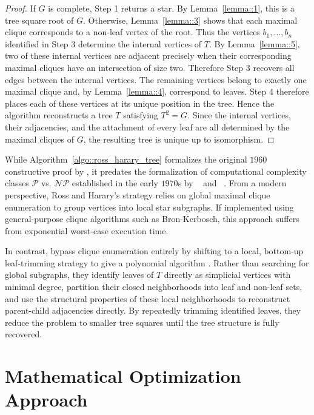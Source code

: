 \documentclass[11pt]{report}
\begin{document}
\begin{proof}
  If $G$ is complete, Step 1 returns a star. By Lemma~\ref{lemma::1}, this is a tree square root of $G$. Otherwise, Lemma~\ref{lemma::3} shows that each maximal clique corresponds to a non-leaf vertex of the root. Thus the vertices $b_1,\ldots,b_n$ identified in Step 3 determine the internal vertices of $T$. By Lemma~\ref{lemma::5}, two of these internal vertices are adjacent precisely when their corresponding maximal cliques have an intersection of size two. Therefore Step 3 recovers all edges between the internal vertices. The remaining vertices belong to exactly one maximal clique and, by Lemma~\ref{lemma::4}, correspond to leaves. Step 4 therefore places each of these vertices at its unique position in the tree. Hence the algorithm reconstructs a tree $T$ satisfying $T^2=G$. Since the internal vertices, their adjacencies, and the attachment of every leaf are all determined by the maximal cliques of $G$, the resulting tree is unique up to isomorphism.
\end{proof}

While Algorithm~\ref{algo::ross_harary_tree} formalizes the original $1960$ constructive proof by \citeauthor{ross_1960_square}, it predates the formalization of computational complexity classes $\mathcal{P}$ vs. $\mathcal{NP}$ established in the early $1970$s by \citeauthor{cook_1971_complexity}~\parencite{cook_1971_complexity}
and \citeauthor{karp_1972_reducibility}~\parencite{karp_1972_reducibility}. From a modern perspective, Ross and Harary's strategy relies on global maximal clique enumeration to group vertices into local star subgraphs. If implemented using general-purpose clique algorithms such as Bron-Kerbosch, this approach suffers from exponential worst-case execution time.

In contrast, \citeauthor{lin_1995_square_roots} bypass clique enumeration entirely by shifting to a local, bottom-up leaf-trimming strategy to give a polynomial algorithm \cite{lin_1995_square_roots}. Rather than searching for global subgraphs, they identify leaves of $T$ directly as simplicial vertices with minimal degree, partition their closed neighborhoods into leaf and non-leaf sets, and use the structural properties of these local neighborhoods to reconstruct parent-child adjacencies directly. By repeatedly trimming identified leaves, they reduce the problem to smaller tree squares until the tree structure is fully recovered.

\section{Mathematical Optimization Approach} \label{sec::mathematical_optimization_approach}
\end{document}
